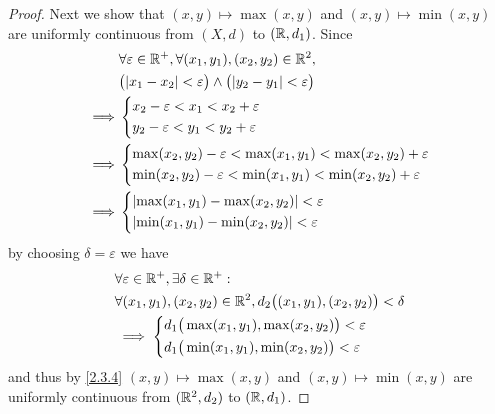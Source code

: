 \begin{proof}
  Next we show that \((x, y) \mapsto \max(x, y)\) and \((x, y) \mapsto \min(x, y)\) are uniformly continuous from \((X, d)\) to \((\mathbb{R}, d_1)\).
  Since
  \begin{align*}
             & \forall \varepsilon \in \R^+, \forall (x_1, y_1), (x_2, y_2) \in \R^2,                \\
             & \big(\abs{x_1 - x_2} < \varepsilon\big) \land \big(\abs{y_2 - y_1} < \varepsilon\big) \\
    \implies & \begin{dcases}
                 x_2 - \varepsilon < x_1 < x_2 + \varepsilon \\
                 y_2 - \varepsilon < y_1 < y_2 + \varepsilon \\
               \end{dcases}                                           \\
    \implies & \begin{dcases}
                 \max(x_2, y_2) - \varepsilon < \max(x_1, y_1) < \max(x_2, y_2) + \varepsilon \\
                 \min(x_2, y_2) - \varepsilon < \min(x_1, y_1) < \min(x_2, y_2) + \varepsilon
               \end{dcases}          \\
    \implies & \begin{dcases}
                 \abs{\max(x_1, y_1) - \max(x_2, y_2)} < \varepsilon \\
                 \abs{\min(x_1, y_1) - \min(x_2, y_2)} < \varepsilon
               \end{dcases}
  \end{align*}
  by choosing \(\delta = \varepsilon\) we have
  \begin{align*}
     & \forall \varepsilon \in \mathbb{R}^+, \exists \delta \in \mathbb{R}^+ :                               \\
     & \forall (x_1, y_1), (x_2, y_2) \in \mathbb{R}^2, d_2\big((x_1, y_1), (x_2, y_2)\big) < \delta \\
     & \implies \begin{dcases}
                  d_1\big(\max(x_1, y_1), \max(x_2, y_2)\big) < \varepsilon \\
                  d_1\big(\min(x_1, y_1), \min(x_2, y_2)\big) < \varepsilon
                \end{dcases}
  \end{align*}
  and thus by \cref{2.3.4} \((x, y) \mapsto \max(x, y)\) and \((x, y) \mapsto \min(x, y)\) are uniformly continuous from \((\mathbb{R}^2, d_2)\) to \((\mathbb{R}, d_1)\).


\end{proof}
